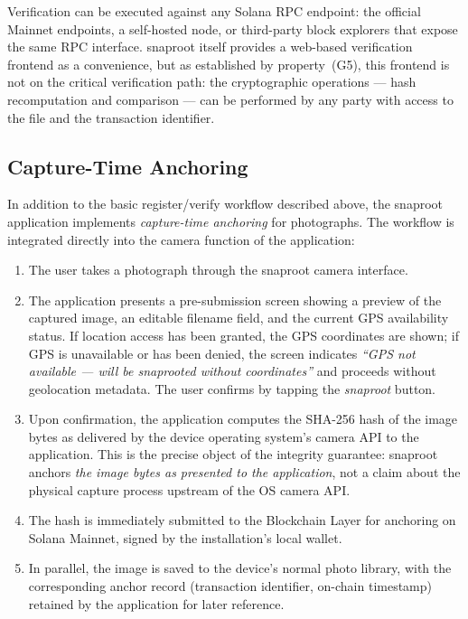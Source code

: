 \documentclass[11pt,a4paper]{article}
\begin{document}
Verification can be executed against any Solana RPC endpoint: the
official Mainnet endpoints, a self-hosted node, or third-party
block explorers that expose the same RPC interface. snaproot itself
provides a web-based verification frontend as a convenience, but as
established by property~(G5), this frontend is not on the critical
verification path: the cryptographic operations --- hash recomputation
and comparison --- can be performed by any party with access to the
file and the transaction identifier.

\subsection{Capture-Time Anchoring}
\label{sec:architecture:capture}

In addition to the basic register/verify workflow described above, the
snaproot application implements \emph{capture-time anchoring} for
photographs. The workflow is integrated directly into the camera
function of the application:

\begin{enumerate}
\item The user takes a photograph through the snaproot camera interface.
\item The application presents a pre-submission screen showing a preview
of the captured image, an editable filename field, and the current GPS
availability status. If location access has been granted, the GPS
coordinates are shown; if GPS is unavailable or has been denied, the
screen indicates \emph{``GPS not available --- will be snaprooted without
coordinates''} and proceeds without geolocation metadata. The user
confirms by tapping the \emph{snaproot} button.
\item Upon confirmation, the application computes the SHA-256 hash of the
image bytes as delivered by the device operating system's camera API
to the application. This is the precise object of the integrity
guarantee: snaproot anchors \emph{the image bytes as presented to the
application}, not a claim about the physical capture process upstream
of the OS camera API.
\item The hash is immediately submitted to the Blockchain Layer for
anchoring on Solana Mainnet, signed by the installation's local wallet.
\item In parallel, the image is saved to the device's normal photo
library, with the corresponding anchor record (transaction identifier,
on-chain timestamp) retained by the application for later reference.
\end{enumerate}
\end{document}
